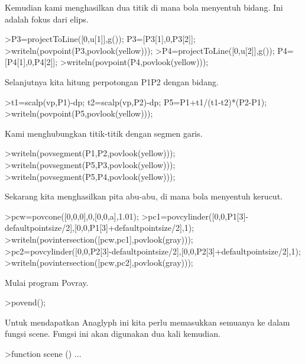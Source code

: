 \documentclass[a4paper,10pt]{article}
\begin{document}
\begin{eulernotebook}
\begin{eulercomment}
\begin{eulercomment}
\begin{eulercomment}
Kemudian kami menghasilkan dua titik di mana bola menyentuh bidang.
Ini adalah fokus dari elips.
\end{eulercomment}
\begin{eulerprompt}
>P3=projectToLine([0,u[1]],g()); P3=[P3[1],0,P3[2]];
>writeln(povpoint(P3,povlook(yellow)));
>P4=projectToLine([0,u[2]],g()); P4=[P4[1],0,P4[2]];
>writeln(povpoint(P4,povlook(yellow)));
\end{eulerprompt}
\begin{eulercomment}
Selanjutnya kita hitung perpotongan P1P2 dengan bidang.
\end{eulercomment}
\begin{eulerprompt}
>t1=scalp(vp,P1)-dp; t2=scalp(vp,P2)-dp; P5=P1+t1/(t1-t2)*(P2-P1);
>writeln(povpoint(P5,povlook(yellow)));
\end{eulerprompt}
\begin{eulercomment}
Kami menghubungkan titik-titik dengan segmen garis.
\end{eulercomment}
\begin{eulerprompt}
>writeln(povsegment(P1,P2,povlook(yellow)));
>writeln(povsegment(P5,P3,povlook(yellow)));
>writeln(povsegment(P5,P4,povlook(yellow)));
\end{eulerprompt}
\begin{eulercomment}
Sekarang kita menghasilkan pita abu-abu, di mana bola menyentuh
kerucut.
\end{eulercomment}
\begin{eulerprompt}
>pcw=povcone([0,0,0],0,[0,0,a],1.01);
>pc1=povcylinder([0,0,P1[3]-defaultpointsize/2],[0,0,P1[3]+defaultpointsize/2],1);
>writeln(povintersection([pcw,pc1],povlook(gray)));
>pc2=povcylinder([0,0,P2[3]-defaultpointsize/2],[0,0,P2[3]+defaultpointsize/2],1);
>writeln(povintersection([pcw,pc2],povlook(gray)));
\end{eulerprompt}
\begin{eulercomment}
Mulai program Povray.
\end{eulercomment}
\begin{eulerprompt}
>povend();
\end{eulerprompt}
\begin{eulercomment}
Untuk mendapatkan Anaglyph ini kita perlu memasukkan semuanya ke dalam
fungsi scene. Fungsi ini akan digunakan dua kali kemudian.
\end{eulercomment}
\begin{eulerprompt}
>function scene () ...
\end{eulerprompt}

\end{eulercomment}
\end{eulercomment}
\end{eulernotebook}
\end{document}
